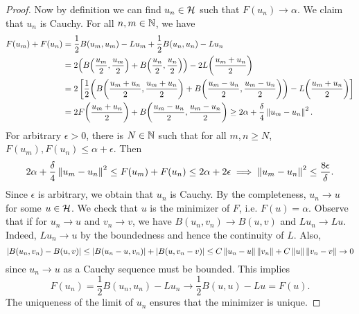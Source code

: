 \begin{proof}
    Now by definition we can find $u_n\in\mathcal{H}$ such that $F(u_n)\to\alpha$. 
    We claim that $u_n$ is Cauchy. For all $n,m\in\mathbb{N}$, we have 
    \begin{equation*}
        \begin{split}
            F(u_m) + F(u_n) &= \frac{1}{2}B(u_m,u_m) - Lu_m + \frac{1}{2}B(u_n,u_n) - Lu_n \\
            &= 2\pth{B\pth{\frac{u_m}{2},\frac{u_m}{2}} + B\pth{\frac{u_n}{2},\frac{u_n}{2}}} - 2L\pth{\frac{u_m+u_n}{2}} \\
            &= 2\sbrc{\frac{1}{2}\pth{B\pth{\frac{u_m+u_n}{2},\frac{u_m+u_n}{2}} + B\pth{\frac{u_m-u_n}{2},\frac{u_m-u_n}{2}}} - L\pth{\frac{u_m+u_n}{2}}} \\ 
            &= 2F\pth{\frac{u_m+u_n}{2}} + B\pth{\frac{u_m-u_n}{2},\frac{u_m-u_n}{2}} 
            \geq 2\alpha + \frac{\delta}{4}\norm{u_m-u_n}^2.
        \end{split}
    \end{equation*}
    For arbitrary $\epsilon>0$, there is $N\in\mathbb{N}$ such that for all $m,n\geq N$, 
    $F(u_m),F(u_n)\leq \alpha + \epsilon$. Then
    \begin{equation*}
        2\alpha + \frac{\delta}{4}\left\lVert {u_m-u_n} \right\rVert^2 \leq F(u_m) + F(u_n) \leq 2\alpha + 2\epsilon
        \implies \left\lVert {u_m-u_n} \right\rVert^2 \leq \frac{8\epsilon}{\delta}.
    \end{equation*}
    Since $\epsilon$ is arbitrary, we obtain that $u_n$ is Cauchy. By the 
    completeness, $u_n\to u$ for some $u\in\mathcal{H}$. We check that $u$ is the 
    minimizer of $F$, i.e. $F(u) = \alpha$. Observe that if for $u_n\to u$ 
    and $v_n\to v$, we have $B(u_n,v_n)\to B(u,v)$ and $Lu_n\to Lu$. Indeed, 
    $Lu_n\to u$ by the boundedness and hence the continuity of $L$. Also, 
    \begin{equation*}
        \left\lvert {B(u_n,v_n) - B(u,v)} \right\rvert \leq \left\lvert {B(u_n-u,v_n)} \right\rvert + \left\lvert {B(u,v_n-v)} \right\rvert 
        \leq C\left\lVert {u_n-u} \right\rVert\left\lVert {v_n} \right\rVert + C\left\lVert {u} \right\rVert\left\lVert {v_n-v} \right\rVert \to 0
    \end{equation*}
    since $u_n\to u$ as a Cauchy sequence must be bounded. This implies 
    \begin{equation*}
        F(u_n) = \frac{1}{2}B(u_n,u_n) - Lu_n \to \frac{1}{2}B(u,u) - Lu = F(u).
    \end{equation*}
    The uniqueness of the limit of $u_n$ ensures that the minimizer is unique.
\end{proof}

